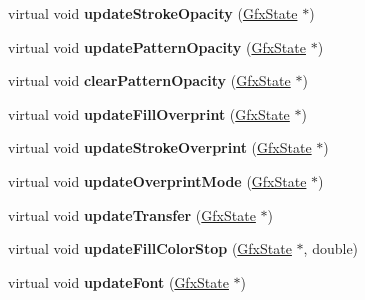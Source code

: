 \begin{DoxyCompactItemize}
\mbox{\label{class_output_dev_aae769c911e3adf88fe09b4e7d3ba4430}} 
virtual void {\bfseries update\+Stroke\+Opacity} (\hyperlink{class_gfx_state}{Gfx\+State} $\ast$)
\item 
\mbox{\label{class_output_dev_a87fabe2327708ebb0a29604a4b0b1b77}} 
virtual void {\bfseries update\+Pattern\+Opacity} (\hyperlink{class_gfx_state}{Gfx\+State} $\ast$)
\item 
\mbox{\label{class_output_dev_a909e1d99398b8387f7ddcaa53de9e9d6}} 
virtual void {\bfseries clear\+Pattern\+Opacity} (\hyperlink{class_gfx_state}{Gfx\+State} $\ast$)
\item 
\mbox{\label{class_output_dev_aa1256118203d372534ce8d1b2fed6582}} 
virtual void {\bfseries update\+Fill\+Overprint} (\hyperlink{class_gfx_state}{Gfx\+State} $\ast$)
\item 
\mbox{\label{class_output_dev_a0d5a0433b4ef0b21a8a6a13f72bf78f2}} 
virtual void {\bfseries update\+Stroke\+Overprint} (\hyperlink{class_gfx_state}{Gfx\+State} $\ast$)
\item 
\mbox{\label{class_output_dev_a6fb0ff3d1ac46fede38478376be83e8d}} 
virtual void {\bfseries update\+Overprint\+Mode} (\hyperlink{class_gfx_state}{Gfx\+State} $\ast$)
\item 
\mbox{\label{class_output_dev_a88f138182fee6e2139c9ec16f5d2c7b0}} 
virtual void {\bfseries update\+Transfer} (\hyperlink{class_gfx_state}{Gfx\+State} $\ast$)
\item 
\mbox{\label{class_output_dev_a3d08d3dd986deb8de48a7984d5fc1d5b}} 
virtual void {\bfseries update\+Fill\+Color\+Stop} (\hyperlink{class_gfx_state}{Gfx\+State} $\ast$, double)
\item 
\mbox{\label{class_output_dev_af59f68777aac425cdf8e1bcc964680f2}} 
virtual void {\bfseries update\+Font} (\hyperlink{class_gfx_state}{Gfx\+State} $\ast$)
\item 
\mbox{\label{class_output_dev_a44a3b5ca4aa58bc026fc2e28417ac113}} 

\end{DoxyCompactItemize}
